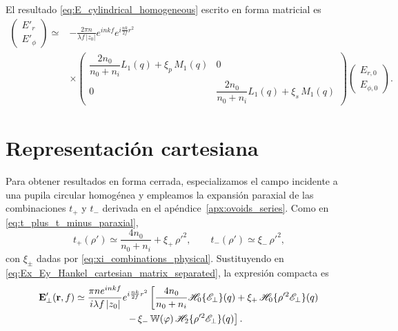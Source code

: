 El resultado \eqref{eq:E_cylindrical_homogeneous} escrito en forma matricial es
\begin{equation}
\begin{aligned}
\begin{pmatrix}
E'_r\\
E'_\phi
\end{pmatrix}
\simeq{}&
-\frac{2\pi n}{\lambda f\,|z_0|}
e^{inkf}
e^{i\frac{nk}{2f}r^2}
\\
&\times
\begin{pmatrix}
\dfrac{2n_0}{n_0+n_i}L_1(q)+\xi_p\,M_1(q) & 0
\\[0.8em]
0 & \dfrac{2n_0}{n_0+n_i}L_1(q)+\xi_s\,M_1(q)
\end{pmatrix}
\begin{pmatrix}
E_{r,0}\\
E_{\phi,0}
\end{pmatrix}.
\end{aligned}
\label{eq:E_cylindrical_homogeneous_matrix}
\end{equation}

\section{Representación cartesiana}

Para obtener resultados en forma cerrada, especializamos el campo incidente a una pupila circular homogénea y empleamos la expansión paraxial de las combinaciones $t_+$ y $t_-$ derivada en el apéndice~\ref{apx:ovoids_series}. Como en \eqref{eq:t_plus_t_minus_paraxial},
\begin{equation}
t_+(\rho')
\simeq
\frac{4n_0}{n_0+n_i}
+
\xi_+\,\rho'^2,
\qquad
t_-(\rho')
\simeq
\xi_-\,\rho'^2,
\label{eq:t_plus_t_minus_paraxial_cartesian}
\end{equation}
con $\xi_\pm$ dadas por \eqref{eq:xi_combinations_physical}. Sustituyendo en \eqref{eq:Ex_Ey_Hankel_cartesian_matrix_separated}, la expresión compacta es
\begin{equation}
\begin{aligned}
\vb E'_\perp(\vb r,f)
\simeq{}&
\frac{\pi n e^{inkf}}{i\lambda f\,|z_0|}
e^{i\frac{nk}{2f}r^2}
\left[
\frac{4n_0}{n_0+n_i}
\mathscr H_0\{\mathscr E_\perp\}(q)
+
\xi_+\,
\mathscr H_0\{\rho'^2\mathscr E_\perp\}(q)
\right.
\\
&\qquad\qquad
\left.
-\,
\xi_-\,
\mathbb W(\varphi)\,
\mathscr H_2\{\rho'^2\mathscr E_\perp\}(q)
\right].
\end{aligned}
\label{eq:E_field_cartesian_paraxial}
\end{equation}

